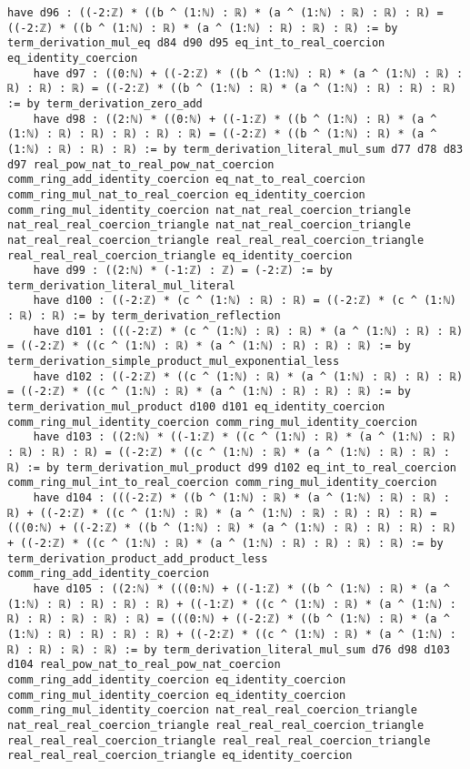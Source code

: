 \documentclass{article}
\begin{document}
\begin{tcolorbox}[colback=white!10, width=\linewidth]
\begin{lstlisting}[language=Lean4]
    have d96 : ((-2:ℤ) * ((b ^ (1:ℕ) : ℝ) * (a ^ (1:ℕ) : ℝ) : ℝ) : ℝ) = ((-2:ℤ) * ((b ^ (1:ℕ) : ℝ) * (a ^ (1:ℕ) : ℝ) : ℝ) : ℝ) := by term_derivation_mul_eq d84 d90 d95 eq_int_to_real_coercion eq_identity_coercion
    have d97 : ((0:ℕ) + ((-2:ℤ) * ((b ^ (1:ℕ) : ℝ) * (a ^ (1:ℕ) : ℝ) : ℝ) : ℝ) : ℝ) = ((-2:ℤ) * ((b ^ (1:ℕ) : ℝ) * (a ^ (1:ℕ) : ℝ) : ℝ) : ℝ) := by term_derivation_zero_add
    have d98 : ((2:ℕ) * ((0:ℕ) + ((-1:ℤ) * ((b ^ (1:ℕ) : ℝ) * (a ^ (1:ℕ) : ℝ) : ℝ) : ℝ) : ℝ) : ℝ) = ((-2:ℤ) * ((b ^ (1:ℕ) : ℝ) * (a ^ (1:ℕ) : ℝ) : ℝ) : ℝ) := by term_derivation_literal_mul_sum d77 d78 d83 d97 real_pow_nat_to_real_pow_nat_coercion comm_ring_add_identity_coercion eq_nat_to_real_coercion comm_ring_mul_nat_to_real_coercion eq_identity_coercion comm_ring_mul_identity_coercion nat_nat_real_coercion_triangle nat_real_real_coercion_triangle nat_nat_real_coercion_triangle nat_real_real_coercion_triangle real_real_real_coercion_triangle real_real_real_coercion_triangle eq_identity_coercion
    have d99 : ((2:ℕ) * (-1:ℤ) : ℤ) = (-2:ℤ) := by term_derivation_literal_mul_literal
    have d100 : ((-2:ℤ) * (c ^ (1:ℕ) : ℝ) : ℝ) = ((-2:ℤ) * (c ^ (1:ℕ) : ℝ) : ℝ) := by term_derivation_reflection
    have d101 : (((-2:ℤ) * (c ^ (1:ℕ) : ℝ) : ℝ) * (a ^ (1:ℕ) : ℝ) : ℝ) = ((-2:ℤ) * ((c ^ (1:ℕ) : ℝ) * (a ^ (1:ℕ) : ℝ) : ℝ) : ℝ) := by term_derivation_simple_product_mul_exponential_less
    have d102 : ((-2:ℤ) * ((c ^ (1:ℕ) : ℝ) * (a ^ (1:ℕ) : ℝ) : ℝ) : ℝ) = ((-2:ℤ) * ((c ^ (1:ℕ) : ℝ) * (a ^ (1:ℕ) : ℝ) : ℝ) : ℝ) := by term_derivation_mul_product d100 d101 eq_identity_coercion comm_ring_mul_identity_coercion comm_ring_mul_identity_coercion
    have d103 : ((2:ℕ) * ((-1:ℤ) * ((c ^ (1:ℕ) : ℝ) * (a ^ (1:ℕ) : ℝ) : ℝ) : ℝ) : ℝ) = ((-2:ℤ) * ((c ^ (1:ℕ) : ℝ) * (a ^ (1:ℕ) : ℝ) : ℝ) : ℝ) := by term_derivation_mul_product d99 d102 eq_int_to_real_coercion comm_ring_mul_int_to_real_coercion comm_ring_mul_identity_coercion
    have d104 : (((-2:ℤ) * ((b ^ (1:ℕ) : ℝ) * (a ^ (1:ℕ) : ℝ) : ℝ) : ℝ) + ((-2:ℤ) * ((c ^ (1:ℕ) : ℝ) * (a ^ (1:ℕ) : ℝ) : ℝ) : ℝ) : ℝ) = (((0:ℕ) + ((-2:ℤ) * ((b ^ (1:ℕ) : ℝ) * (a ^ (1:ℕ) : ℝ) : ℝ) : ℝ) : ℝ) + ((-2:ℤ) * ((c ^ (1:ℕ) : ℝ) * (a ^ (1:ℕ) : ℝ) : ℝ) : ℝ) : ℝ) := by term_derivation_product_add_product_less comm_ring_add_identity_coercion
    have d105 : ((2:ℕ) * (((0:ℕ) + ((-1:ℤ) * ((b ^ (1:ℕ) : ℝ) * (a ^ (1:ℕ) : ℝ) : ℝ) : ℝ) : ℝ) + ((-1:ℤ) * ((c ^ (1:ℕ) : ℝ) * (a ^ (1:ℕ) : ℝ) : ℝ) : ℝ) : ℝ) : ℝ) = (((0:ℕ) + ((-2:ℤ) * ((b ^ (1:ℕ) : ℝ) * (a ^ (1:ℕ) : ℝ) : ℝ) : ℝ) : ℝ) + ((-2:ℤ) * ((c ^ (1:ℕ) : ℝ) * (a ^ (1:ℕ) : ℝ) : ℝ) : ℝ) : ℝ) := by term_derivation_literal_mul_sum d76 d98 d103 d104 real_pow_nat_to_real_pow_nat_coercion comm_ring_add_identity_coercion eq_identity_coercion comm_ring_mul_identity_coercion eq_identity_coercion comm_ring_mul_identity_coercion nat_real_real_coercion_triangle nat_real_real_coercion_triangle real_real_real_coercion_triangle real_real_real_coercion_triangle real_real_real_coercion_triangle real_real_real_coercion_triangle eq_identity_coercion

\end{lstlisting}
\end{tcolorbox}
\end{document}
